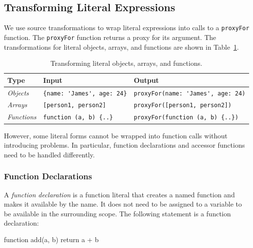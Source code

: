 \subsection{Transforming Literal Expressions}

We use source transformations to wrap literal expressions into calls to a \lstinline{proxyFor} function.
The \lstinline{proxyFor} function returns a proxy for its argument.
The transformations for literal objects, arrays, and functions are shown in Table~\ref{table:literalTransforms}.

\begin{table}[h]
\begin{center}
\begin{tabular}{| l | l | l |}
\hline
Type & Input & Output \\ \hline
\emph{Objects} & \lstinline|{name: 'James', age: 24}| & \lstinline|proxyFor(name: 'James', age: 24)| \\ \hline
\emph{Arrays} & \lstinline|[person1, person2]| & \lstinline|proxyFor([person1, person2])| \\ \hline
\emph{Functions} & \lstinline|function (a, b) {..}| & \lstinline|proxyFor(function (a, b) {..})| \\ \hline
\end{tabular}
\end{center}
\caption[Table caption text]{Transforming literal objects, arrays, and functions.}
\label{table:literalTransforms}
\end{table}

However, some literal forms cannot be wrapped into function calls without introducing problems.
In particular, function declarations and accessor functions need to be handled differently.


\subsubsection{Function Declarations}

A \emph{function declaration} is a function literal that creates a named function and makes it available by the name.
It does not need to be assigned to a variable to be available in the surrounding scope.
The following statement is a function declaration:

\begin{code}{}{}
function add(a, b) {return a + b}
\end{code}
\iffalse
\end{verbatim}\fi

